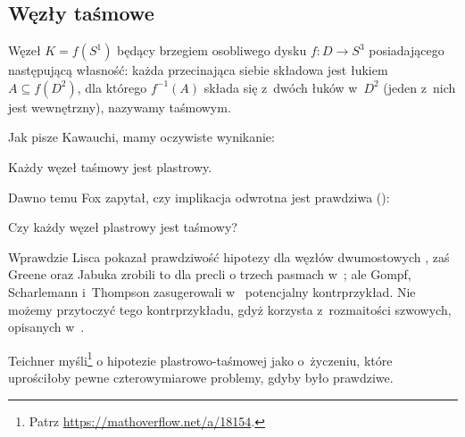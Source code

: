 
\subsection{Węzły taśmowe}
\begin{definition}
    Węzeł $K = f(S^1)$ będący brzegiem osobliwego dysku $f \colon D \to S^3$ posiadającego następującą własność: każda przecinająca siebie składowa jest łukiem $A \subseteq f(D^2)$, dla którego $f^{-1}(A)$ składa się z~dwóch łuków w~$D^2$ (jeden z~nich jest wewnętrzny), nazywamy taśmowym.
\end{definition}

Jak pisze Kawauchi, mamy oczywiste wynikanie:

\begin{proposition}
%
    Każdy węzeł taśmowy jest plastrowy.
\end{proposition}

Dawno temu Fox zapytał, czy implikacja odwrotna jest prawdziwa (\cite[problem 1.33]{kirby78}):
%

\begin{conjecture}
    Czy każdy węzeł plastrowy jest taśmowy?
\end{conjecture}

Wprawdzie Lisca pokazał prawdziwość hipotezy dla węzłów dwumostowych \cite{lisca07},
%
%
zaś Greene oraz Jabuka zrobili to dla precli o trzech pasmach w~\cite{greene11};
%
%
%
ale Gompf, Scharlemann i~Thompson zasugerowali w~\cite{gompf10} potencjalny kontrprzykład.
%
%
%
%
Nie możemy przytoczyć tego kontrprzykładu, gdyż korzysta z~rozmaitości szwowych, opisanych w~\cite[s. 53-59]{kawauchi96}.

Teichner myśli\footnote{Patrz \url{https://mathoverflow.net/a/18154}.} o hipotezie plastrowo-taśmowej jako o~życzeniu, które uprościłoby pewne czterowymiarowe problemy, gdyby było prawdziwe.
%



